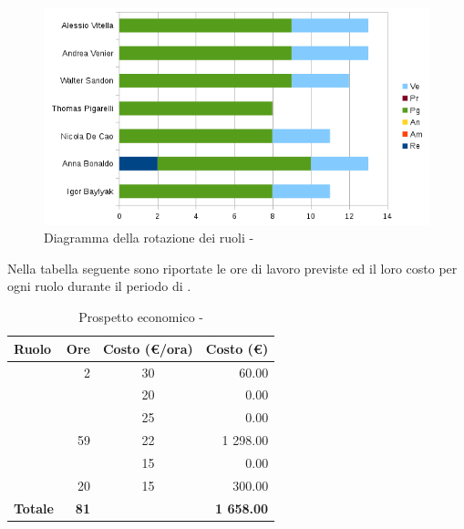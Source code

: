 \documentclass[12pt,a4paper]{article}
\begin{document}
\begin{center}
	\begin{figure}[H]
		\centering \includegraphics[width=\textwidth]{../img/diagrammaBarreProgettazioneArchitetturaleRotazioneRuoli.png}
		\caption{Diagramma della rotazione dei ruoli - \FPA{}}
	\end{figure}
\end{center}

\newpage
{}
Nella tabella seguente sono riportate le ore di lavoro previste ed il loro costo per ogni ruolo durante il periodo di \FP.

\begin{table}[H]
	\begin{center}
		\begin{tabular}{l r c r}
			\toprule
			\textbf{Ruolo}	& \textbf{Ore} & \textbf{Costo (\euro/ora)}	& \textbf{Costo (\euro)} \\ \midrule
			\midrule
			\RE{} & 2 & 30 & 60.00 \\ \midrule
			\AM{} & & 20 & 0.00 \\ \midrule
			\AN{} & & 25 & 0.00 \\ \midrule
			\PG{} & 59 & 22 & 1 298.00 \\ \midrule
			\PR{} & & 15 & 0.00 \\ \midrule
			\VR{} & 20 & 15 & 300.00 \\ \midrule
			\textbf{Totale} & \textbf{81} &  & \textbf{1 658.00} \\
			\bottomrule
		\end{tabular}
		\caption{Prospetto economico - \FPA{}}
	\end{center}
\end{table}
\end{document}

